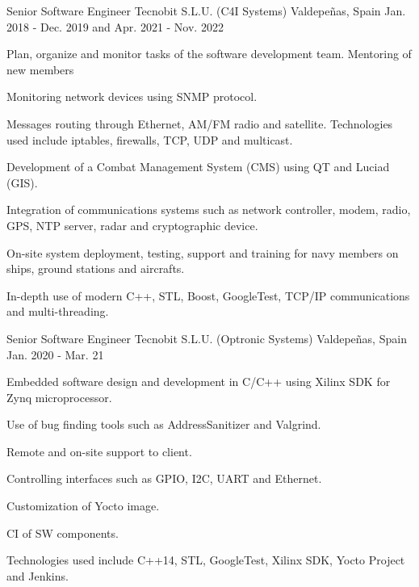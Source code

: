 

\begin{cventries}

  \cventry
    {Senior Software Engineer} %
    {Tecnobit S.L.U. (C4I Systems)} %
    {Valdepeñas, Spain} %
    {Jan. 2018 - Dec. 2019 and Apr. 2021 - Nov. 2022} %
    {
      \begin{cvitems} %
        \item {Plan, organize and monitor tasks of the software development team. Mentoring of new members}
        \item {Monitoring network devices using SNMP protocol.}
        \item {Messages routing through Ethernet, AM/FM radio and satellite. Technologies used include iptables, firewalls, TCP, UDP and multicast.}
        \item {Development of a Combat Management System (CMS) using QT and Luciad (GIS).}
        \item {Integration of communications systems such as network controller, modem, radio, GPS, NTP server, radar and cryptographic device.}
        \item {On-site system deployment, testing, support and training for navy members on ships, ground stations and aircrafts.}
        \item {In-depth use of modern C++, STL, Boost, GoogleTest, TCP/IP communications and multi-threading.}
      \end{cvitems}
    }

  \cventry
    {Senior Software Engineer} %
    {Tecnobit S.L.U. (Optronic Systems)} %
    {Valdepeñas, Spain} %
    {Jan. 2020 - Mar. 21} %
    {
      \begin{cvitems} %
        \item {Embedded software design and development in C/C++ using Xilinx SDK for Zynq microprocessor.}
        \item {Use of bug finding tools such as AddressSanitizer and Valgrind. }
        \item {Remote and on-site support to client.}
        \item {Controlling interfaces such as GPIO,  I2C, UART and Ethernet.}
        \item {Customization of Yocto image.}
        \item {CI of SW components.}
        \item {Technologies used include C++14, STL, GoogleTest, Xilinx SDK, Yocto Project and Jenkins.}
      \end{cvitems}
    }


\end{cventries}
